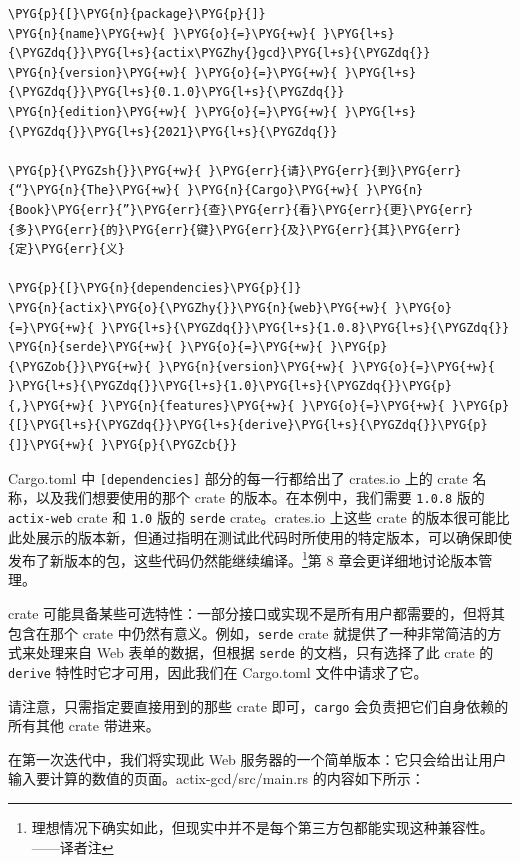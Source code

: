 \begin{Verbatim}[commandchars=\\\{\},breaklines=true,breakanywhere=true,fontsize=\codefont,xleftmargin=17bp]
\PYG{p}{[}\PYG{n}{package}\PYG{p}{]}
\PYG{n}{name}\PYG{+w}{ }\PYG{o}{=}\PYG{+w}{ }\PYG{l+s}{\PYGZdq{}}\PYG{l+s}{actix\PYGZhy{}gcd}\PYG{l+s}{\PYGZdq{}}
\PYG{n}{version}\PYG{+w}{ }\PYG{o}{=}\PYG{+w}{ }\PYG{l+s}{\PYGZdq{}}\PYG{l+s}{0.1.0}\PYG{l+s}{\PYGZdq{}}
\PYG{n}{edition}\PYG{+w}{ }\PYG{o}{=}\PYG{+w}{ }\PYG{l+s}{\PYGZdq{}}\PYG{l+s}{2021}\PYG{l+s}{\PYGZdq{}}

\PYG{p}{\PYGZsh{}}\PYG{+w}{ }\PYG{err}{请}\PYG{err}{到}\PYG{err}{“}\PYG{n}{The}\PYG{+w}{ }\PYG{n}{Cargo}\PYG{+w}{ }\PYG{n}{Book}\PYG{err}{”}\PYG{err}{查}\PYG{err}{看}\PYG{err}{更}\PYG{err}{多}\PYG{err}{的}\PYG{err}{键}\PYG{err}{及}\PYG{err}{其}\PYG{err}{定}\PYG{err}{义}

\PYG{p}{[}\PYG{n}{dependencies}\PYG{p}{]}
\PYG{n}{actix}\PYG{o}{\PYGZhy{}}\PYG{n}{web}\PYG{+w}{ }\PYG{o}{=}\PYG{+w}{ }\PYG{l+s}{\PYGZdq{}}\PYG{l+s}{1.0.8}\PYG{l+s}{\PYGZdq{}}
\PYG{n}{serde}\PYG{+w}{ }\PYG{o}{=}\PYG{+w}{ }\PYG{p}{\PYGZob{}}\PYG{+w}{ }\PYG{n}{version}\PYG{+w}{ }\PYG{o}{=}\PYG{+w}{ }\PYG{l+s}{\PYGZdq{}}\PYG{l+s}{1.0}\PYG{l+s}{\PYGZdq{}}\PYG{p}{,}\PYG{+w}{ }\PYG{n}{features}\PYG{+w}{ }\PYG{o}{=}\PYG{+w}{ }\PYG{p}{[}\PYG{l+s}{\PYGZdq{}}\PYG{l+s}{derive}\PYG{l+s}{\PYGZdq{}}\PYG{p}{]}\PYG{+w}{ }\PYG{p}{\PYGZcb{}}
\end{Verbatim}

Cargo.toml 中 \texttt{[dependencies]} 部分的每一行都给出了 crates.io 上的 crate 名称，以及我们想要使用的那个 crate 的版本。在本例中，我们需要 \texttt{1.0.8} 版的 \texttt{actix-web} crate 和 \texttt{1.0} 版的 \texttt{serde} crate。crates.io 上这些 crate 的版本很可能比此处展示的版本新，但通过指明在测试此代码时所使用的特定版本，可以确保即使发布了新版本的包，这些代码仍然能继续编译。\footnote{理想情况下确实如此，但现实中并不是每个第三方包都能实现这种兼容性。——译者注}第 8 章会更详细地讨论版本管理。

crate 可能具备某些可选特性：一部分接口或实现不是所有用户都需要的，但将其包含在那个 crate 中仍然有意义。例如，\texttt{serde} crate 就提供了一种非常简洁的方式来处理来自 Web 表单的数据，但根据 \texttt{serde} 的文档，只有选择了此 crate 的 \texttt{derive} 特性时它才可用，因此我们在 Cargo.toml 文件中请求了它。

请注意，只需指定要直接用到的那些 crate 即可，\texttt{cargo} 会负责把它们自身依赖的所有其他 crate 带进来。

在第一次迭代中，我们将实现此 Web 服务器的一个简单版本：它只会给出让用户输入要计算的数值的页面。actix-gcd/\allowbreak{}src/\allowbreak{}main.rs 的内容如下所示：

